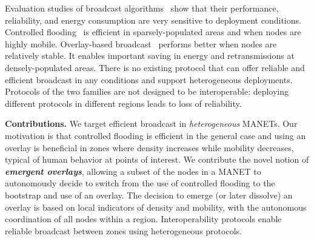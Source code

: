 Evaluation studies of broadcast algorithms~\cite{DensityMobDrivenEval,Williams2002} show that their performance, reliability, and energy consumption are very sensitive to deployment conditions.
Controlled flooding~\cite{ObraczkaK_2001, adaptive_group_com_iscc02} is efficient in sparsely-populated areas and when nodes are highly mobile.
Overlay-based broadcast~\cite{Nikolov2015, stojmenovic-cds, mpr} performs better when nodes are relatively stable.
It enables important saving in energy and retransmissions at densely-populated areas.
%
There is no existing protocol that can offer reliable and efficient broadcast in any conditions and support heterogeneous deployments.
Protocols of the two families are not designed to be interoperable: deploying different protocols in different regions leads to loss of reliability.


\smallskip
\noindent
\textbf{Contributions.}
%
We target efficient broadcast in \emph{heterogeneous} MANETs.
Our motivation is that controlled flooding is efficient in the general case and using an overlay is beneficial in zones where density increases while mobility decreases, typical of human behavior at points of interest.
%
We contribute the novel notion of \emph{\textbf{emergent overlays}}, allowing a subset of the nodes in a MANET to autonomously decide to switch from the use of controlled flooding to the bootstrap and use of an overlay.
%
The decision to emerge (or later dissolve) an overlay is based on local indicators of density and mobility, with the autonomous coordination of all nodes within a region.
%
Interoperability protocols enable reliable broadcast between zones using heterogeneous protocols.

